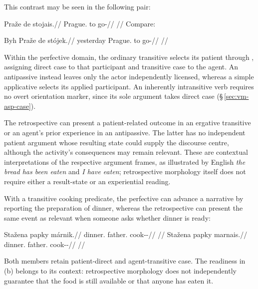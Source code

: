 This contrast may be seen in the following pair:

\pex
\a
\begingl
\gla Praže de stojais.//
\glb Prague.\Ind{} to go-\Ret{}//
\glft {}//
\endgl
\a Compare:\par
\begingl
\gla Byh Praže de stójek.//
\glb yesterday Prague.\Ind{} to go-\Pf{}//
\glft {} //
\endgl
\xe

Within the perfective domain, the ordinary transitive selects its patient
through , assigning direct case to that participant and transitive
case to the agent. An antipassive instead leaves only the actor independently
licensed, whereas a simple applicative selects its applied participant. An
inherently intransitive verb requires no overt orientation marker, since its
sole argument takes direct case (§\,\ref{sec:vm-asp-case}).

The retrospective can present a patient-related outcome in an ergative
transitive or an agent's prior experience in an antipassive. The latter has no
independent patient argument whose resulting state could supply the discourse
centre, although the activity's consequences may remain relevant. These are
contextual interpretations of the respective argument frames, as illustrated
by English \textit{the bread has been eaten} and \textit{I have eaten};
retrospective morphology itself does not require either a result-state or an
experiential reading.

With a transitive cooking predicate, the perfective can advance a narrative
by reporting the preparation of dinner, whereas the retrospective can present
the same event as relevant when someone asks whether dinner is ready:

\pex\label{ex:vm-slot-occurrence-anteriority}
\a
\begingl
\gla Stažena papky márnik.//
\glb dinner.\Dir{} father.\Trs{} cook-\Trs{}-\Pf{}//
\glft {}
//
\endgl
\a
\begingl
\gla Stažena papky marnais.//
\glb dinner.\Dir{} father.\Trs{} cook-\Trs{}-\Ret{}//
\glft {}
//
\endgl
\xe

Both members retain patient-direct and agent-transitive case. The readiness
in (b) belongs to its context: retrospective morphology does not independently
guarantee that the food is still available or that anyone has eaten it.

